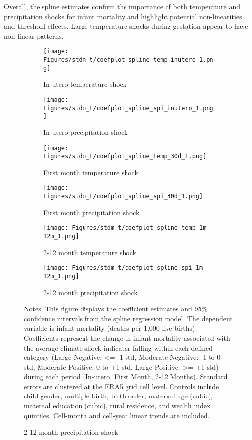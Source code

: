 \documentclass[a4paper]{article}
\begin{document}
Overall, the spline estimates confirm the importance of both temperature and precipitation shocks for infant mortality and highlight potential non-linearities and threshold effects.  Large temperature shocks during gestation appear to have non-linear patterns.

\begin{figure}[p!]
    \begin{center}
    \caption{Spline Estimates of Climate Shock Impacts on Infant Mortality}
    \label{fig:spline_coefplot}
    \begin{subfigure}{0.43\textwidth}
        \centering
        \texttt{[image: Figures/stdm\_t/coefplot\_spline\_temp\_inutero\_1.png]}
        \caption{In-utero temperature shock}
    \end{subfigure}%
    \begin{subfigure}{0.43\textwidth}
        \centering
        \texttt{[image: Figures/stdm\_t/coefplot\_spline\_spi\_inutero\_1.png]}
        \caption{In-utero precipitation shock}
    \end{subfigure}\hfill
    \begin{subfigure}{0.43\textwidth}
        \centering
        \texttt{[image: Figures/stdm\_t/coefplot\_spline\_temp\_30d\_1.png]}
        \caption{First month temperature shock}
    \end{subfigure}%
    \begin{subfigure}{0.43\textwidth}
        \centering
        \texttt{[image: Figures/stdm\_t/coefplot\_spline\_spi\_30d\_1.png]}
        \caption{First month precipitation shock}
    \end{subfigure}\hfill%
    \begin{subfigure}{0.43\textwidth}
        \centering
        \texttt{[image: Figures/stdm\_t/coefplot\_spline\_temp\_1m-12m\_1.png]}
        \caption{2-12 month temperature shock}
    \end{subfigure}%
    \begin{subfigure}{0.43\textwidth}
        \centering
        \texttt{[image: Figures/stdm\_t/coefplot\_spline\_spi\_1m-12m\_1.png]}
        \caption{2-12 month precipitation shock}
    \end{subfigure}\hfill%
    \end{center}
    \footnotesize{Notes: This figure displays the coefficient estimates and 95\% confidence intervals from the spline regression model. The dependent variable is infant mortality (deaths per 1,000 live births). Coefficients represent the change in infant mortality associated with the average climate shock indicator falling within each defined category (Large Negative: <= -1 std, Moderate Negative: -1 to 0 std, Moderate Positive: 0 to +1 std, Large Positive: >= +1 std) during each period (In-utero, First Month, 2-12 Months). Standard errors are clustered at the ERA5 grid cell level. Controls include child gender, multiple birth, birth order, maternal age (cubic), maternal education (cubic), rural residence, and wealth index quintiles. Cell-month and cell-year linear trends are included.}
\end{figure}
\end{document}

